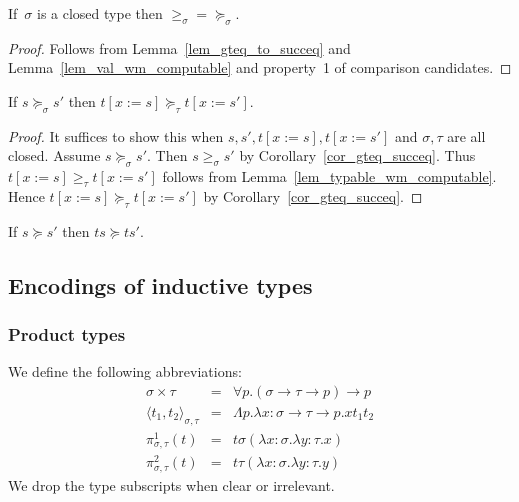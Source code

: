 \documentclass[runningheads,a4paper]{llncs}
\newcommand{\arrtype}{\rightarrow}
\newcommand{\abs}[2]{\lambda #1.#2}
\newcommand{\tabs}[2]{\Lambda #1.#2}
\newcommand{\pair}[2]{\langle #1,#2 \rangle}
\newcommand{\subst}[2]{#1:=#2}
\newcommand{\flatten}{\mathtt{flatten}}
\newcommand{\lift}{\mathtt{lift}}
\begin{document}
\begin{corollary}\label{cor_gteq_succeq}
  If~$\sigma$ is a closed type then ${\geq_{\sigma}} =
  {\succeq_\sigma}$.
\end{corollary}

\begin{proof}
  Follows from Lemma~\ref{lem_gteq_to_succeq} and
  Lemma~\ref{lem_val_wm_computable} and property~1 of comparison
  candidates.
\end{proof}

\begin{lemma}\label{lem_succeq_subst}
  If $s \succeq_\sigma s'$ then $t[\subst{x}{s}] \succeq_\tau t[\subst{x}{s'}]$.
\end{lemma}

\begin{proof}
  It suffices to show this when
  $s,s',t[\subst{x}{s}],t[\subst{x}{s'}]$ and $\sigma,\tau$ are all
  closed. Assume $s \succeq_\sigma s'$. Then $s \geq_{\sigma} s'$
  by Corollary~\ref{cor_gteq_succeq}. Thus $t[\subst{x}{s}]
  \geq_{\tau} t[\subst{x}{s'}]$ follows from
  Lemma~\ref{lem_typable_wm_computable}. Hence $t[\subst{x}{s}]
  \succeq_\tau t[\subst{x}{s'}]$ by Corollary~\ref{cor_gteq_succeq}.
\end{proof}

\begin{corollary}\label{cor_app_wm}
  If $s \succeq s'$ then $t s \succeq t s'$.
\end{corollary}

\subsection{Encodings of inductive types}\label{sec_encodings}

\subsubsection{Product types}

\begin{definition}\normalfont
  We define the following abbreviations:
  \[
  \begin{array}{rcl}
    \sigma \times \tau &=& \forall p . (\sigma \arrtype \tau \arrtype p) \arrtype p \\
    \pair{t_1}{t_2}_{\sigma,\tau} &=& \tabs{p}{\abs{x:\sigma\arrtype\tau\arrtype p}{x t_1 t_2 %
    }} \\
    \pi^1_{\sigma,\tau}(t) &=& t \sigma (\abs{x:\sigma}{\abs{y:\tau}{x}}) \\
    \pi^2_{\sigma,\tau}(t) &=& t \tau (\abs{x:\sigma}{\abs{y:\tau}{y}})
  \end{array}
  \]
  We drop the type subscripts when clear or irrelevant.
\end{definition}
\end{document}
